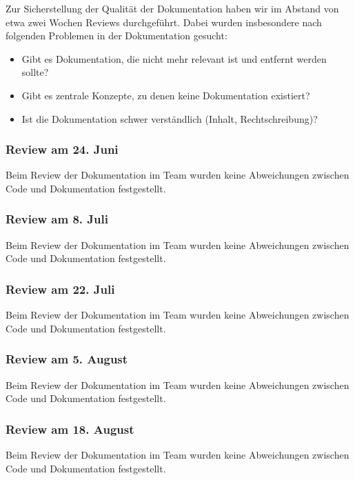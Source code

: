
Zur Sicherstellung der Qualität der Dokumentation haben wir im Abstand von etwa zwei Wochen Reviews durchgeführt. Dabei wurden insbesondere nach folgenden Problemen in der Dokumentation gesucht:

\begin{itemize}
\item Gibt es Dokumentation, die nicht mehr relevant ist und entfernt werden sollte?
\item Gibt es zentrale Konzepte, zu denen keine Dokumentation existiert?
\item Ist die Dokumentation schwer verständlich (Inhalt, Rechtschreibung)?
\end{itemize}




\subsubsection{Review am 24. Juni}

Beim Review der Dokumentation im Team wurden keine Abweichungen zwischen Code und Dokumentation festgestellt.


\subsubsection{Review am 8. Juli}

Beim Review der Dokumentation im Team wurden keine Abweichungen zwischen Code und Dokumentation festgestellt.


\subsubsection{Review am 22. Juli}

Beim Review der Dokumentation im Team wurden keine Abweichungen zwischen Code und Dokumentation festgestellt.


\subsubsection{Review am 5. August}

Beim Review der Dokumentation im Team wurden keine Abweichungen zwischen Code und Dokumentation festgestellt.


\subsubsection{Review am 18. August}

Beim Review der Dokumentation im Team wurden keine Abweichungen zwischen Code und Dokumentation festgestellt.


